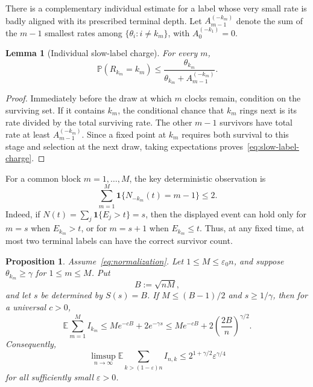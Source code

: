 \documentclass[11pt]{article}
\newtheorem{proposition}[theorem]{Proposition}
\newtheorem{lemma}[theorem]{Lemma}
\theoremstyle{remark}
\theoremstyle{plain}
\newcommand{\E}{\mathbb E}
\newcommand{\Pp}{\mathbb P}
\newcommand{\one}{\mathbf 1}
\newcommand{\eps}{\varepsilon}
\begin{document}
There is a complementary individual estimate for a label whose very small
rate is badly aligned with its prescribed terminal depth.  Let
$A_{m-1}^{(-k_m)}$ denote the sum of the $m-1$ smallest rates among
$\{\theta_i:i\ne k_m\}$, with $A_0^{(-k_1)}=0$.

\begin{lemma}[Individual slow-label charge]
\label{lem:slow-label-charge}
For every $m$,
\begin{equation}\label{eq:slow-label-charge}
 \Pp(R_{k_m}=k_m)
 \le
 \frac{\theta_{k_m}}
      {\theta_{k_m}+A_{m-1}^{(-k_m)}}.
\end{equation}
\end{lemma}

\begin{proof}
Immediately before the draw at which $m$ clocks remain, condition on the
surviving set.  If it contains $k_m$, the conditional chance that $k_m$ rings
next is its rate divided by the total surviving rate.  The other $m-1$
survivors have total rate at least $A_{m-1}^{(-k_m)}$.  Since a fixed point at
$k_m$ requires both survival to this stage and selection at the next draw,
taking expectations proves~\eqref{eq:slow-label-charge}.
\end{proof}

For a common block $m=1,\ldots,M$, the key deterministic observation is
\begin{equation}\label{eq:two-candidate}
 \sum_{m=1}^M\one\{N_{-k_m}(t)=m-1\}\le2.
\end{equation}
Indeed, if $N(t)=\sum_j\one\{E_j>t\}=s$, then the displayed event can hold only
for $m=s$ when $E_{k_m}>t$, or for $m=s+1$ when $E_{k_m}\le t$.  Thus, at any
fixed time, at most two terminal labels can have the correct survivor count.

\begin{proposition}\label{prop:uniform-endpoint-bound}
Assume~\eqref{eq:normalization}.  Let $1\le M\le\eps_0n$, and suppose
$\theta_{k_m}\ge\gamma$ for $1\le m\le M$.  Put
\begin{equation}\label{eq:B-definition}
 B:=\sqrt{nM},
\end{equation}
and let $s$ be determined by $S(s)=B$.  If $M\le(B-1)/2$ and $s\ge1/\gamma$,
then for a universal $c>0$,
\begin{equation}\label{eq:tail-explicit}
 \E\sum_{m=1}^M I_{k_m}
 \le M e^{-cB}+2e^{-\gamma s}
 \le M e^{-cB}+2\left(\frac{2B}{n}\right)^{\gamma/2}.
\end{equation}
Consequently,
\begin{equation}\label{eq:tail-epsilon}
 \limsup_{n\to\infty}
 \E\sum_{k>(1-\eps)n}I_{n,k}
 \le 2^{1+\gamma/2}\eps^{\gamma/4}
\end{equation}
for all sufficiently small $\eps>0$.
\end{proposition}
\end{document}
